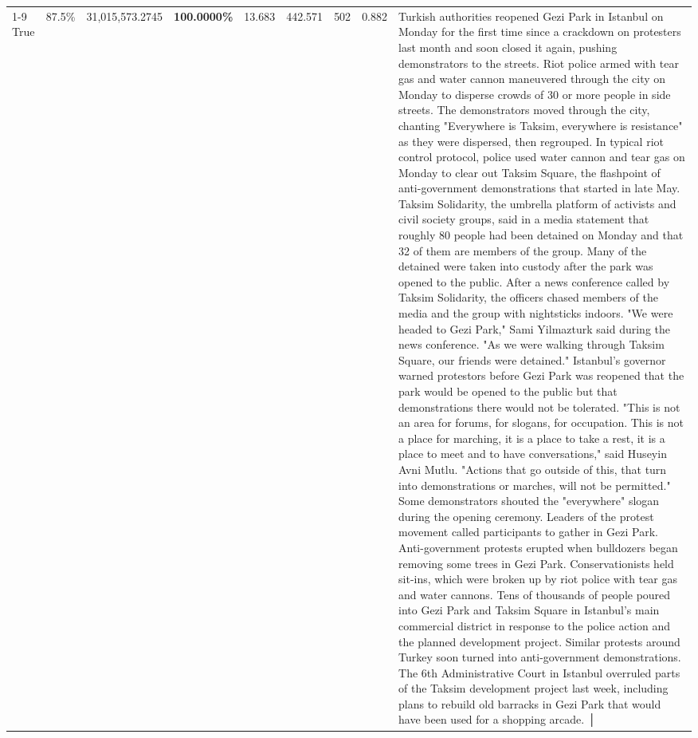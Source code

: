 \begin{table}[H]
\begin{tabular}{lllrlllll}
\cline{1-9}
True & 87.5\% & 31,015,573.2745 & \bfseries \color{red} 100.0000\% & 13.683 & 442.571 & 502 & 0.882 & Turkish authorities reopened Gezi Park in Istanbul on Monday for the first time since a crackdown on protesters last month and soon closed it again, pushing demonstrators to the streets. Riot police armed with tear gas and water cannon maneuvered through the city on Monday to disperse crowds of 30 or more people in side streets. The demonstrators moved through the city, chanting "Everywhere is Taksim, everywhere is resistance" as they were dispersed, then regrouped. In typical riot control protocol, police used water cannon and tear gas on Monday to clear out Taksim Square, the flashpoint of anti-government demonstrations that started in late May. Taksim Solidarity, the umbrella platform of activists and civil society groups, said in a media statement that roughly 80 people had been detained on Monday and that 32 of them are members of the group. Many of the detained were taken into custody after the park was opened to the public. After a news conference called by Taksim Solidarity, the officers chased members of the media and the group with nightsticks indoors. "We were headed to Gezi Park," Sami Yilmazturk said during the news conference. "As we were walking through Taksim Square, our friends were detained." Istanbul's governor warned protestors before Gezi Park was reopened that the park would be opened to the public but that demonstrations there would not be tolerated. "This is not an area for forums, for slogans, for occupation. This is not a place for marching, it is a place to take a rest, it is a place to meet and to have conversations," said Huseyin Avni Mutlu. "Actions that go outside of this, that turn into demonstrations or marches, will not be permitted." Some demonstrators shouted the "everywhere" slogan during the opening ceremony. Leaders of the protest movement called participants to gather in Gezi Park. Anti-government protests erupted when bulldozers began removing some trees in Gezi Park. Conservationists held sit-ins, which were broken up by riot police with tear gas and water cannons. Tens of thousands of people poured into Gezi Park and Taksim Square in Istanbul's main commercial district in response to the police action and the planned development project. Similar protests around Turkey soon turned into anti-government demonstrations. The 6th Administrative Court in Istanbul overruled parts of the Taksim development project last week, including plans to rebuild old barracks in Gezi Park that would have been used for a shopping arcade. │ \\

\end{tabular}
\end{table}

